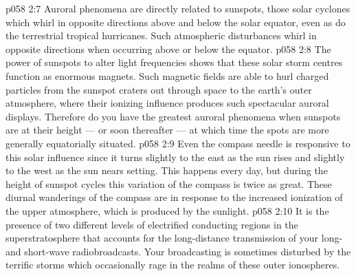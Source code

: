 \vs p058 2:7 Auroral phenomena are directly related to sunspots, those solar cyclones which whirl in opposite directions above and below the solar equator, even as do the terrestrial tropical hurricanes. Such atmospheric disturbances whirl in opposite directions when occurring above or below the equator.
\vs p058 2:8 The power of sunspots to alter light frequencies shows that these solar storm centres function as enormous magnets. Such magnetic fields are able to hurl charged particles from the sunspot craters out through space to the earth’s outer atmosphere, where their ionizing influence produces such spectacular auroral displays. Therefore do you have the greatest auroral phenomena when sunspots are at their height --- or soon thereafter --- at which time the spots are more generally equatorially situated.
\vs p058 2:9 Even the compass needle is responsive to this solar influence since it turns slightly to the east as the sun rises and slightly to the west as the sun nears setting. This happens every day, but during the height of sunspot cycles this variation of the compass is twice as great. These diurnal wanderings of the compass are in response to the increased ionization of the upper atmosphere, which is produced by the sunlight.
\vs p058 2:10 It is the presence of two different levels of electrified conducting regions in the superstratosphere that accounts for the long\hyp{}distance transmission of your long\hyp{} and short\hyp{}wave radiobroadcasts. Your broadcasting is sometimes disturbed by the terrific storms which occasionally rage in the realms of these outer ionospheres.
